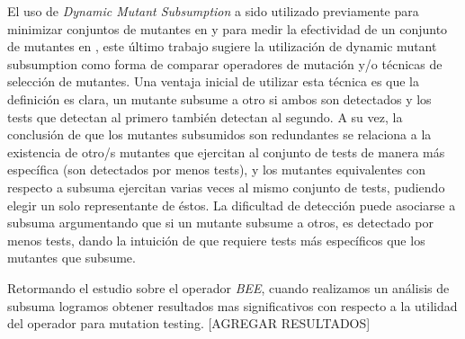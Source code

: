 El uso de \emph{Dynamic Mutant Subsumption} a sido utilizado previamente para minimizar conjuntos de mutantes en \cite{bibliography.mutation.minimizing.dynamicsubsumption} y para medir la efectividad de un conjunto de mutantes en \cite{bibliography.mutation.efectiveness.dynamicsubsumption}, este \'ultimo trabajo sugiere la utilizaci\'on de dynamic mutant subsumption como forma de comparar operadores de mutaci\'on y/o t\'ecnicas de selecci\'on de mutantes. Una ventaja inicial de utilizar esta t\'ecnica es que la definici\'on es clara, un mutante subsume a otro si ambos son detectados y los tests que detectan al primero tambi\'en detectan al segundo. A su vez, la conclusi\'on de que los mutantes subsumidos son redundantes se relaciona a la existencia de otro/s mutantes que ejercitan al conjunto de tests de manera m\'as espec\'ifica (son detectados por menos tests), y los mutantes equivalentes con respecto a subsuma ejercitan varias veces al mismo conjunto de tests, pudiendo elegir un solo representante de \'estos. La dificultad de detecci\'on puede asociarse a subsuma argumentando que si un mutante subsume a otros, es detectado por menos tests, dando la intuici\'on de que requiere tests m\'as espec\'ificos que los mutantes que subsume.

Retormando el estudio sobre el operador \emph{BEE}, cuando realizamos un an\'alisis de subsuma logramos obtener resultados mas significativos con respecto a la utilidad del operador para mutation testing. [AGREGAR RESULTADOS]